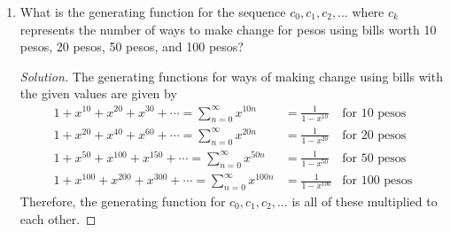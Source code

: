 \documentclass{article}
\newenvironment{solution}
  {\renewcommand\qedsymbol{$\blacksquare$}\begin{proof}[Solution]}
  {\end{proof}}
\begin{document}
\begin{enumerate}
\begin{solution}
        Therefore, the generating function is given by $\bigg(\dfrac{1}{1-x}\bigg) \bigg(\dfrac{1}{1-x^2}\bigg) \bigg(\dfrac{1}{1-x^5}\bigg)$ 
    \end{solution} 
    \item What is the generating function for the sequence $c_0, c_1, c_2, \hdots$ where $c_k$ represents the number of ways to make change for pesos using bills worth 10 pesos, 20 pesos, 50 pesos, and 100 pesos?\begin{solution} 
        The generating functions for ways of making change using bills with the given values are given by\begin{align*} 
            1 + x^{10} + x^{20} + x^{30} + \cdots = \sum_{n=0}^\infty x^{10n} &=\frac{1}{1-x^{10}} &\text{for 10 pesos} \\ 
            1 + x^{20} + x^{40} + x^{60} + \cdots = \sum_{n=0}^\infty x^{20n} &=\frac{1}{1-x^{20}} &\text{for 20 pesos} \\
            1 + x^{50} + x^{100} + x^{150} + \cdots = \sum_{n=0}^\infty x^{50n} &=\frac{1}{1-x^{50}} &\text{for 50 pesos} \\
            1 + x^{100} + x^{200} + x^{300} + \cdots = \sum_{n=0}^\infty x^{100n} &=\frac{1}{1-x^{100}} &\text{for 100 pesos} 
        \end{align*} Therefore, the generating function for $c_0, c_1, c_2, \hdots$ is all of these multiplied to each other.
    \end{solution} 
\end{enumerate}

\pagebreak 
\end{document}
